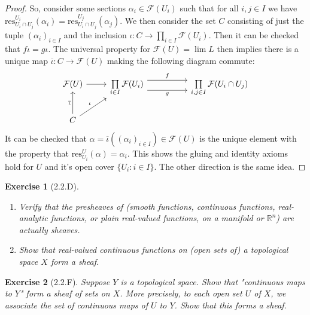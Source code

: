 \documentclass{amsart}
\newtheorem*{exercise*}{Exercise}
\begin{document}
\begin{proof}
    So, consider some sections $\alpha_i\in \mathcal{F}(U_i)$ such that for all $i, j\in I$ we have $\mathrm{res}^{U_i}_{U_i\cap U_j}(\alpha_i)=\mathrm{res}^{U_j}_{U_i\cap U_j}(\alpha_j)$. We then consider the set $C$ consisting of just the tuple $(\alpha_i)_{i\in I}$ and the inclusion $\iota:C\rightarrow \prod_{i\in I}\mathcal{F}(U_i)$. Then it can be checked that $f\iota=g\iota$. The universal property for $\mathcal{F}(U)=\lim L$ then implies there is a unique map $\overline{\iota}:C\rightarrow\mathcal{F}(U)$ making the following diagram commute:
    \begin{equation*}
        \begin{tikzcd}
            \mathcal{F}(U) \arrow[r] & \prod\limits_{i\in I}\mathcal{F}(U_i) \arrow[rr, shift left = 2, "f"] \arrow[rr, shift right = 3, "g"'] & & \prod\limits_{i, j\in I} \mathcal{F}(U_i\cap U_j) \\
            C \arrow[u, "\overline{\iota}"] \arrow[ru, "\iota"] & & &
        \end{tikzcd}
    \end{equation*}
    It can be checked that $\alpha=\overline{\iota}((\alpha_i)_{i\in I})\in \mathcal{F}(U)$ is the unique element with the property that $\mathrm{res}^U_{U_i}(\alpha)=\alpha_i$. This shows the gluing and identity axioms hold for $U$ and it's open cover $\{U_i:i\in I\}$. The other direction is the same idea. 
\end{proof}

\vspace{0.1in}


\begin{exercise*}[2.2.D]
    \begin{enumerate}
        \item Verify that the presheaves of (smooth functions, continuous functions, 
        real-analytic functions, or plain real-valued functions, on a manifold 
        or $\mathbb{R}^n$) are actually sheaves.
        \item Show that real-valued continuous functions on (open sets of) a topological space
        $X$ form a sheaf.
    \end{enumerate}
\end{exercise*}

\vspace{0.1in}


\begin{exercise*}[2.2.F]
    Suppose $Y$ is a topological space. Show that "continuous maps to $Y$" form a sheaf
    of sets on $X$. More precisely, to each open set $U$ of $X$, we associate the set of
    continuous maps of $U$ to $Y$. Show that this forms a sheaf. 
\end{exercise*}
\end{document}
